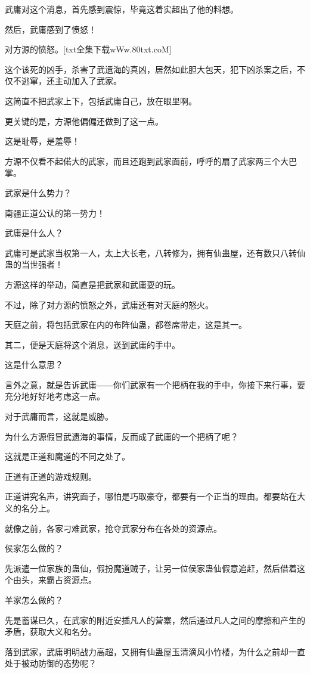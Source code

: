 \begin{this_body}
武庸对这个消息，首先感到震惊，毕竟这着实超出了他的料想。

然后，武庸感到了愤怒！

对方源的愤怒。[txt全集下载wWw.80txt.coM]

这个该死的凶手，杀害了武遗海的真凶，居然如此胆大包天，犯下凶杀案之后，不仅不逃窜，还主动加入了武家。

这简直不把武家上下，包括武庸自己，放在眼里啊。

更关键的是，方源他偏偏还做到了这一点。

这是耻辱，是羞辱！

方源不仅看不起偌大的武家，而且还跑到武家面前，呼呼的扇了武家两三个大巴掌。

武家是什么势力？

南疆正道公认的第一势力！

武庸是什么人？

武庸可是武家当权第一人，太上大长老，八转修为，拥有仙蛊屋，还有数只八转仙蛊的当世强者！

方源这样的举动，简直是把武家和武庸耍的玩。

不过，除了对方源的愤怒之外，武庸还有对天庭的怒火。

天庭之前，将包括武家在内的布阵仙蛊，都卷席带走，这是其一。

其二，便是天庭将这个消息，送到武庸的手中。

这是什么意思？

言外之意，就是告诉武庸――你们武家有一个把柄在我的手中，你接下来行事，要充分地好好地考虑这一点。

对于武庸而言，这就是威胁。

为什么方源假冒武遗海的事情，反而成了武庸的一个把柄了呢？

这就是正道和魔道的不同之处了。

正道有正道的游戏规则。

正道讲究名声，讲究面子，哪怕是巧取豪夺，都要有一个正当的理由。都要站在大义的名分上。

就像之前，各家刁难武家，抢夺武家分布在各处的资源点。

侯家怎么做的？

先派遣一位家族的蛊仙，假扮魔道贼子，让另一位侯家蛊仙假意追赶，然后借着这个由头，来霸占资源点。

羊家怎么做的？

先是蓄谋已久，在武家的附近安插凡人的营寨，然后通过凡人之间的摩擦和产生的矛盾，获取大义和名分。

落到武家，武庸明明战力高超，又拥有仙蛊屋玉清滴风小竹楼，为什么之前却一直处于被动防御的态势呢？


\end{this_body}
